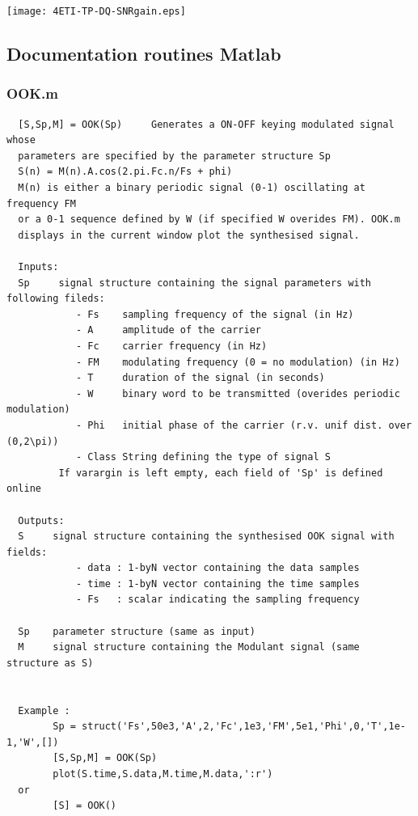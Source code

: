 \documentclass{article}
\begin{document}
\begin{center}
\texttt{[image: 4ETI-TP-DQ-SNRgain.eps]} 
\end{center}

\subsection{Documentation routines Matlab}
\label{sec:annexes-help}

\subsubsection{OOK.m}
   

        \color{lightgray} \begin{verbatim}  [S,Sp,M] = OOK(Sp)     Generates a ON-OFF keying modulated signal whose
  parameters are specified by the parameter structure Sp
  S(n) = M(n).A.cos(2.pi.Fc.n/Fs + phi)
  M(n) is either a binary periodic signal (0-1) oscillating at frequency FM
  or a 0-1 sequence defined by W (if specified W overides FM). OOK.m
  displays in the current window plot the synthesised signal.
 
  Inputs:
  Sp     signal structure containing the signal parameters with following fileds: 
            - Fs    sampling frequency of the signal (in Hz)
            - A     amplitude of the carrier
            - Fc    carrier frequency (in Hz)
            - FM    modulating frequency (0 = no modulation) (in Hz)
            - T     duration of the signal (in seconds)
            - W     binary word to be transmitted (overides periodic modulation)
            - Phi   initial phase of the carrier (r.v. unif dist. over (0,2\pi))
            - Class String defining the type of signal S
         If varargin is left empty, each field of 'Sp' is defined online
 
  Outputs:
  S     signal structure containing the synthesised OOK signal with fields:
            - data : 1-byN vector containing the data samples
            - time : 1-byN vector containing the time samples
            - Fs   : scalar indicating the sampling frequency
  
  Sp    parameter structure (same as input)
  M     signal structure containing the Modulant signal (same structure as S) 
    
 
  Example :
        Sp = struct('Fs',50e3,'A',2,'Fc',1e3,'FM',5e1,'Phi',0,'T',1e-1,'W',[])
        [S,Sp,M] = OOK(Sp) 
        plot(S.time,S.data,M.time,M.data,':r')
  or
        [S] = OOK() 
\end{verbatim} \color{black}
\end{document}
